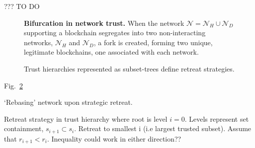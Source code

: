 

??? TO DO

\begin{figure}[!htb]
	\centering
	\resizebox{0.5\columnwidth}{!}{}
	\caption{\textbf{Bifurcation in network trust.} When the network \mbox{$\mathcal{N}=\mathcal{N}_H\cup\mathcal{N}_D$} supporting a blockchain segregates into two non-interacting networks, $\mathcal{N}_H$ and $\mathcal{N}_D$, a fork is created, forming two unique, legitimate blockchains, one associated with each network.} \label{fig:forking}
\end{figure}

\begin{figure}[!htb]
	\caption{Trust hierarchies represented as subset-trees define retreat strategies.} \label{fig:subset_tree}
\end{figure}

Fig.~\ref{fig:subset_tree}

`Rebasing' network upon strategic retreat.

Retreat strategy in trust hierarchy where root is level $i=0$. Levels represent set containment, $s_{i+1}\subset s_i$. Retreat to smallest i (i.e largest trusted subset). Assume that $r_{i+1}<r_i$. Inequality could work in either direction??
